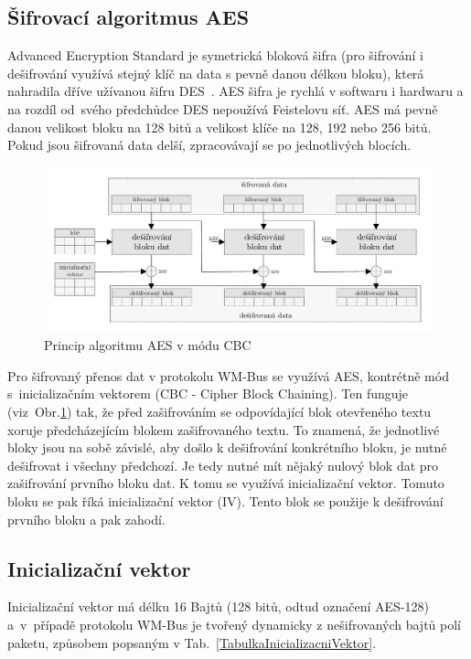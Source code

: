 \subsection{Šifrovací algoritmus AES}
Advanced Encryption Standard je symetrická bloková šifra (pro šifrování i dešifrování využívá stejný klíč na data s pevně danou délkou bloku), která nahradila dříve užívanou šifru DES~\cite{NormaFIPS}. AES šifra je rychlá v softwaru i hardwaru a na rozdíl od~svého předchůdce DES nepoužívá Feistelovu síť. AES má pevně danou velikost bloku na 128 bitů a velikost klíče na 128, 192 nebo 256 bitů.   Pokud jsou šifrovaná data delší, zpracovávají se po jednotlivých blocích. 

\begin{figure}[!ht]
\vspace{-10pt}
 \begin{center}
    \includegraphics[scale=0.7]{obrazky/wmbus_aes_cbc}
  \end{center}
	\vspace{-30pt}
  \caption{Princip algoritmu AES v módu CBC}
	\label{SchemaAEScbc}
	\vspace{-10pt}
\end{figure}

Pro šifrovaný přenos dat v protokolu WM-Bus se využívá AES, kontrétně mód s~inicializačním vektorem (CBC - Cipher Block Chaining). Ten funguje (viz~Obr.\ref{SchemaAEScbc}) tak, že před zašifrováním se odpovídající blok otevřeného textu xoruje předcházejícím blokem zašifrovaného textu. To znamená, že jednotlivé bloky jsou na sobě závislé, aby došlo k dešifrování konkrétního bloku, je nutné  dešifrovat i všechny předchozí. Je tedy nutné mít nějaký nulový blok dat pro zašifrování prvního bloku dat. K tomu se využívá inicializační vektor. Tomuto bloku se pak říká inicializační vektor (IV). Tento blok se použije k dešifrování prvního bloku a pak zahodí.



\subsection{Inicializační vektor}
\label{KapitolaInicializacniVektor}
Inicializační vektor má délku 16 Bajtů (128 bitů, odtud označení AES-128) a~v~případě protokolu WM-Bus je tvořený dynamicky z nešifrovaných bajtů polí paketu, způsobem popsaným v Tab.~\ref{TabulkaInicializacniVektor}.

